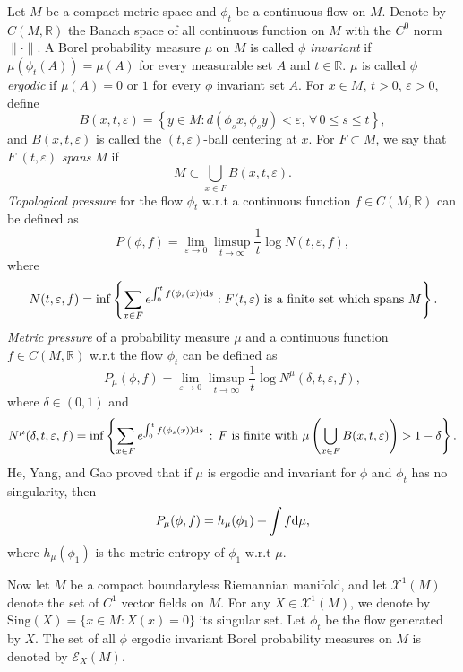 \documentclass[10pt]{article}
\newtheorem*{Theorem A}{Theorem A}
\begin{document}
Let $M$ be a compact metric space and $\phi_t$ be a continuous flow on $M$. Denote by $C(M, \mathbb{R})$ the Banach space of all continuous function on $M$ with the $C^0$ norm $\|\cdot\|$. A Borel probability measure $\mu$ on $M$ is called $\phi$ {\it invariant} if $\mu(\phi_t(A))=\mu(A)$ for every measurable set $A$ and $t\in\mathbb{R}$. $\mu$ is called $\phi$ {\it ergodic }if $\mu(A)=0 \text{ or } 1$ for every $\phi$ invariant set $A$. For \(x \in M\), \(t > 0\), \(\varepsilon > 0\), define
\[
B(x, t, \varepsilon) = \left\{ y \in M : d(\phi_{s}x, \phi_s y) < \varepsilon, \,\forall\, 0 \leq s \leq t \right\},
\]
and \(B(x, t, \varepsilon)\) is called the \((t, \varepsilon)\)-ball centering at \(x\).
For $F\subset M$, we say that $F$ $(t, \varepsilon)$ {\it spans} $M$ if
\[M\subset\bigcup_{x\in F}B(x, t, \varepsilon).\]
{\it Topological pressure} for the flow $\phi_t$ w.r.t a continuous function $f\in C(M, \mathbb{R})$ can be defined as
\[P(\phi, f)=\lim_{\varepsilon\to0}\limsup_{t\to\infty}\frac{1}{t}\log N(t, \varepsilon, f),\]
where
\[N(t, \varepsilon, f)=\inf\left\{\sum_{x\in F}e^{\int_0^tf(\phi_s(x)){\rm d}s} : F (t, \varepsilon)\text{ is a finite set which spans } M \right\}.\]
{\it Metric pressure} of a probability measure $\mu$ and a continuous function $f\in C(M, \mathbb{R})$  w.r.t the flow $\phi_t$ can be defined as
\[P_{\mu}(\phi, f)=\lim_{\varepsilon\to 0}\limsup_{t\to\infty}\frac{1}{t}\log N^\mu(\delta, t, \varepsilon, f),\]
where $\delta\in(0,1)$ and
\[N^\mu(\delta, t, \varepsilon, f)=\inf\left\{\sum_{x\in F}e^{\int_0^tf(\phi_s(x)){\rm d}s} \,:\, F \text{ is finite with }\mu\left(\bigcup_{x\in F}B(x, t, \varepsilon)\right)>1-\delta\right\}.\]
He, Yang, and Gao \cite{he2004metrical} proved that if $\mu$ is ergodic and invariant for $\phi$ and $\phi_t$ has no singularity, then
\[P_{\mu}(\phi, f)=h_\mu(\phi_1)+\int f{\rm d}\mu,\]
where $h_\mu(\phi_1)$ is the metric entropy of $\phi_1$ w.r.t $\mu$.



Now let $M$ be a compact boundaryless Riemannian manifold, and let $\mathcal{X}^1(M)$ denote the set of $C^1$ vector fields on $M$. For any $X \in \mathcal{X}^1(M)$, we denote by $\mathrm{Sing}(X) = \{ x \in M : X(x) = 0 \}$ its singular set. Let $\phi_t$ be the flow generated by $X$. The set of all $\phi$ ergodic invariant Borel probability measures on $M$ is denoted by $\mathcal{E}_X(M)$.
\end{document}
